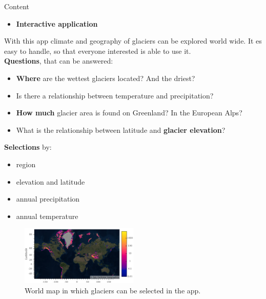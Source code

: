 \documentclass[final]{beamer}
\newcommand*{\smalllogo}[1]{%
	\raisebox{-.3\baselineskip}{%
		\texttt{[image: \#1]}%
	}%
}
\begin{document}
\begin{frame}[fragile]
		\begin{boxblock}{Content}
			\begin{itemize} \item[\smalllogo{lupe_rot.png}] \textbf{Interactive application} \end{itemize}
			\begin{multicols}{2}
						{\normalsize{
						With this app climate and geography of glaciers can be explored world wide. It es easy to handle, so that everyone interested is able to use it.\\
						\vspace*{1cm} 
						\textbf{Questions}, that can be answered:
				\begin{itemize}
						\item \textbf{Where} are the wettest glaciers located? And the driest?
						\item Is there a relationship between temperature and precipitation?
						\item \textbf{How much} glacier area is found on Greenland? In the European Alps? 
						\item What is the relationship between latitude and \textbf{glacier elevation}?
				\end{itemize}
						\vspace*{1cm} 
						\textbf{Selections} by:
				\begin{itemize}
						\item	region
						\item	elevation and latitude
						\item	annual precipitation
						\item	annual temperature
				\end{itemize}
				}}
			\columnbreak
				\begin{figure}
						\includegraphics[width=0.50\textwidth]{app_map} 
						\caption{World map in which glaciers can be selected in the app.}
				\end{figure}
			\end{multicols}
	\end{boxblock}

\vspace*{-1cm}


\end{frame}
\end{document}

